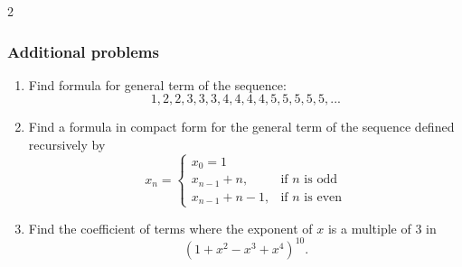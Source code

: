 \documentclass[12pt]{article}
\begin{document}
\begin{multicols}{2}
    \subsubsection*{Additional problems}
    \begin{enumerate}
        \item Find formula for general term of the sequence:
        \[1, 2, 2, 3, 3, 3, 4, 4, 4, 4, 5, 5, 5, 5,5 , ...\]
        \item  Find a formula in compact form for the general term of the sequence defined recursively by \[
        x_n = 
        \begin{cases}
            x_0=1\\
            x_{n-1} + n, & \text{if } n \text{ is odd} \\
            x_{n-1} + n - 1, & \text{if } n \text{ is even}
        \end{cases}
        \]

        \item Find the coefficient of terms where the exponent of $x$ is a multiple of 3 in 
\[
(1 + x^2 - x^3 + x^4)^{10}.
\]

        
    \end{enumerate}


    
\end{multicols}





\vspace{5mm}

\end{document}
